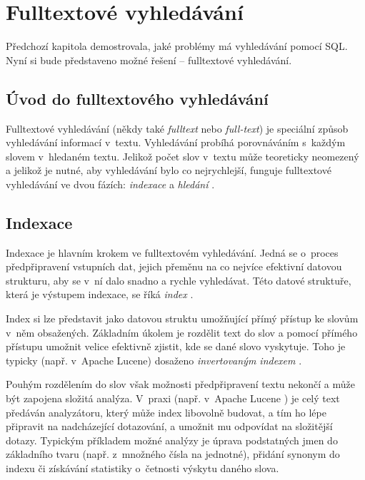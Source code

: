 \documentclass[11pt,oneside]{fithesis2}
\begin{document}
\section{Fulltextové vyhledávání}
Předchozí kapitola demostrovala, jaké problémy má vyhledávání pomocí SQL. Nyní si bude představeno možné řešení -- fulltextové vyhledávání. 

\subsection{Úvod do fulltextového vyhledávání}
\label{UvodDoFulltextu}
Fulltextové vyhledávání (někdy také \emph{fulltext} nebo \emph{full-text}) je speciální způsob vyhledávání informací v~textu. Vyhledávání probíhá porovnáváním s~každým slovem v~hledaném textu. Jelikož počet slov v~textu může teoreticky neomezený a jelikož je 
nutné, aby vyhledávání bylo co nejrychlejší, funguje fulltextové vyhledávání ve dvou fázích: \emph{indexace} a \emph{hledání} \cite[s.~11]{HibernateSearchAction}. 

\subsection{Indexace}
Indexace je hlavním krokem ve fulltextovém vyhledávání. Jedná se o~proces předpřipravení vstupních dat, jejich přeměnu na co nejvíce efektivní datovou strukturu, aby se v~ní dalo snadno a rychle vyhledávat. Této datové struktuře, která je výstupem indexace, se říká \emph{index} \cite[s.~11]{LuceneAction}. 

Index si lze představit jako datovou struktu umožňující přímý přístup ke slovům v~něm obsažených. Základním úkolem je rozdělit text do slov a pomocí přímého přístupu umožnit velice efektivně zjistit, kde se dané slovo vyskytuje. Toho je typicky (např. v~Apache Lucene) dosaženo \emph{invertovaným indexem} \cite[s.~35]{LuceneAction}. %

Pouhým rozdělením do slov však možnosti předpřipravení textu nekončí a může být zapojena složitá analýza. V~praxi (např. v~Apache Lucene \cite[s.~35]{LuceneAction}) je celý text předáván analyzátoru, který může index libovolně budovat, a tím ho lépe připravit na nadcházející dotazování, a umožnit mu odpovídat na složitější dotazy. Typickým příkladem možné analýzy je úprava podstatných jmen do základního tvaru (např. z~množného čísla na jednotné), přidání synonym do indexu či získávání statistiky o~četnosti výskytu daného slova.
\end{document}
